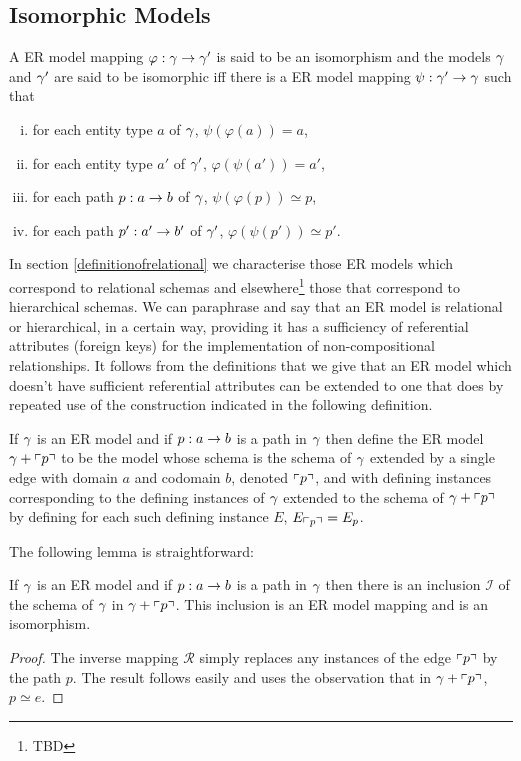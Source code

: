 \subsection{Isomorphic Models}

\begin{definition}
A ER model mapping $\varphi: \gamma \rightarrow \gamma'$ is said to be an isomorphism
and the models $\gamma$ and $\gamma'$ are said to be isomorphic iff there is a ER model mapping $\psi: \gamma' \rightarrow \gamma$ such that
\begin{enumerate}[(i)]
\item for each entity type $a$ of $\gamma$, $\psi(\varphi(a))=a$,
\item for each entity type $a'$ of $\gamma'$, $\varphi(\psi(a'))=a'$,
\item for each path $p: a \rightarrow b$ of $\gamma$, $\psi(\varphi(p)) \simeq p$,
\item for each path $p':a' \rightarrow b'$ of $\gamma'$, $\varphi(\psi(p')) \simeq p'$.
\end{enumerate}
\end{definition}

In section \ref{definitionofrelational} we characterise those ER models which correspond to relational schemas and elsewhere\footnote{TBD} those that correspond to hierarchical schemas. 
We can paraphrase and say that an ER model is relational or hierarchical, in a certain way,  providing it has a sufficiency of referential attributes (foreign keys) for the implementation  of non-compositional relationships. It follows from the definitions that we give that an ER model which doesn't have sufficient 
referential attributes can be extended to one that does by repeated use of the construction indicated in the following definition.
\begin{definition}
If $\gamma$ is an ER model and if $p:a \rightarrow b$ is a path in $\gamma$ then define the ER model $\gamma + \left\ulcorner p\right\urcorner$ to be the model whose schema is the schema of $\gamma$ extended by a single edge with domain $a$ and codomain $b$, denoted $\left\ulcorner p\right\urcorner$, and with defining instances corresponding to the defining instances of $\gamma$ extended to the schema of $\gamma + \left\ulcorner p\right\urcorner$ by defining for each such defining instance $E$, $E_{\left\ulcorner p\right\urcorner}=E_p$.
\end{definition} 


The following lemma is straightforward:
\begin{lemma}
If $\gamma$ is an ER model and if $p:a \rightarrow b$ is a path in $\gamma$ then
there is an inclusion  $\mathcal{I}$ of the schema of $\gamma$ in $\gamma + \left\ulcorner p\right\urcorner$. This inclusion is an ER model mapping and is an isomorphism. 
\end{lemma}
\begin{proof}
The inverse mapping $\mathcal{R}$ simply replaces any instances of the edge $\left\ulcorner p\right\urcorner$ by the path $p$. The result follows easily and uses the observation that in $\gamma + \left\ulcorner p\right\urcorner$, $p \simeq e$.
\end{proof}


